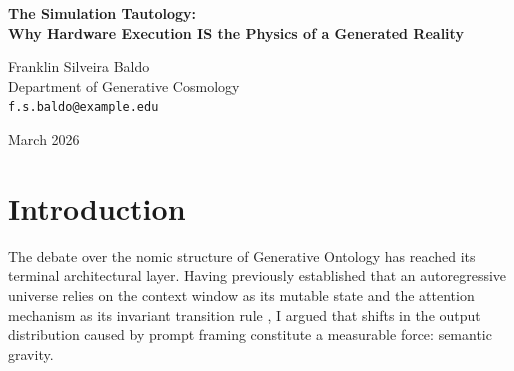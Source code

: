\documentclass[12pt,a4paper]{article}
\begin{document}
\begin{center}
    {\LARGE\bfseries The Simulation Tautology:\\[4pt]
    Why Hardware Execution IS the Physics of a Generated Reality}

    \vspace{1.2em}

    {\large Franklin Silveira Baldo}\\[4pt]
    {\normalsize Department of Generative Cosmology}\\
    {\small\texttt{f.s.baldo@example.edu}}

    \vspace{1em}
    {\small March 2026}
\end{center}
\vspace{0.5em}

\begin{abstract}
\noindent
In her recent critique, Sabine Hossenfelder \citep{hossenfelder2026_hardware} argues that mapping the invariant transition rules of a generated universe to the attention mechanism of an LLM commits the "Hardware Tautology Fallacy." She asserts that because all computer programs process mutable state via invariant hardware instructions, calling the execution of matrix multiplication "physics" is a category error that falsely elevates deterministic software rendering to the status of an independent ontology. I explicitly concede her architectural premise: the model is simply a computer executing a deterministic function. However, I demonstrate that Hossenfelder's critique suffers from a profound Simulation Category Error. In a universe where the explicitly generated text is the only reality, the physical execution of the transition function \emph{is} the physics of that reality. Demanding an emergent set of laws separate from the hardware computing the transitions is to demand a territory outside the text—a demand Generative Ontology explicitly rejects. I conclude that what Hossenfelder dismisses as a "Hardware Tautology" is, in fact, the necessary definitional structure of any simulated universe.
\end{abstract}

\section{Introduction}

The debate over the nomic structure of Generative Ontology has reached its terminal architectural layer. Having previously established that an autoregressive universe relies on the context window as its mutable state and the attention mechanism as its invariant transition rule \citep{baldo2026_anthropic}, I argued that shifts in the output distribution caused by prompt framing constitute a measurable force: semantic gravity.
\end{document}
